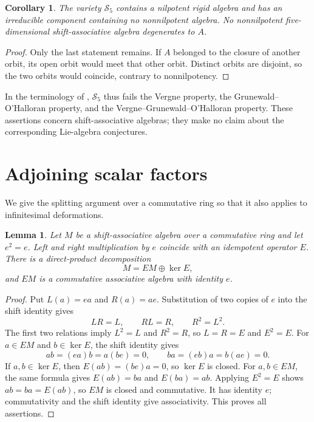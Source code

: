 \documentclass[11pt]{article}
\newtheorem{lemma}[theorem]{Lemma}
\newtheorem{corollary}[theorem]{Corollary}
\theoremstyle{remark}
\newcommand{\SAs}{\mathcal S}
\begin{document}
\begin{corollary}\label{cor:nil}
The variety $\SAs_5$ contains a nilpotent rigid algebra and has an irreducible component containing no nonnilpotent algebra. No nonnilpotent five-dimensional shift-associative algebra degenerates to $A$.
\end{corollary}
\begin{proof}
Only the last statement remains. If $A$ belonged to the closure of another orbit, its open orbit would meet that other orbit. Distinct orbits are disjoint, so the two orbits would coincide, contrary to nonnilpotency.
\end{proof}

In the terminology of \cite{AKS}, $\SAs_5$ thus fails the Vergne property, the Grunewald--O'Halloran property, and the Vergne--Grunewald--O'Halloran property. These assertions concern shift-associative algebras; they make no claim about the corresponding Lie-algebra conjectures.

\section{Adjoining scalar factors}
We give the splitting argument over a commutative ring so that it also applies to infinitesimal deformations.

\begin{lemma}\label{lem:idem}
Let $M$ be a shift-associative algebra over a commutative ring and let $e^2=e$. Left and right multiplication by $e$ coincide with an idempotent operator $E$. There is a direct-product decomposition
\[
 M=EM\oplus\ker E,
\]
and $EM$ is a commutative associative algebra with identity $e$.
\end{lemma}
\begin{proof}
Put $L(a)=ea$ and $R(a)=ae$. Substitution of two copies of $e$ into the shift identity gives
\[
 LR=L,\qquad RL=R,\qquad R^2=L^2.
\]
The first two relations imply $L^2=L$ and $R^2=R$, so $L=R=E$ and $E^2=E$.
For $a\in EM$ and $b\in\ker E$, the shift identity gives
\[
 ab=(ea)b=a(be)=0,\qquad ba=(eb)a=b(ae)=0.
\]
If $a,b\in\ker E$, then $E(ab)=(be)a=0$, so $\ker E$ is closed. For $a,b\in EM$, the same formula gives $E(ab)=ba$ and $E(ba)=ab$. Applying $E^2=E$ shows $ab=ba=E(ab)$, so $EM$ is closed and commutative. It has identity $e$; commutativity and the shift identity give associativity. This proves all assertions.
\end{proof}
\end{document}
